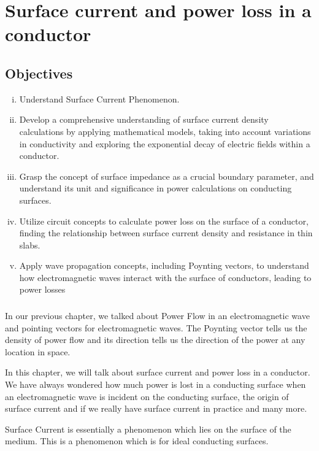 \chapter{Surface current and power loss in a conductor}\label{lec:lec28}

\begin{mdframed}[backgroundcolor=lightblue, linewidth=1pt,  hidealllines=true]
\section{Objectives}
\begin{enumerate}[(i)]
\item Understand Surface Current Phenomenon.
\item Develop a comprehensive understanding of surface current density calculations by applying mathematical models, taking into          account variations in conductivity and exploring the exponential decay of electric fields within a conductor.
\item Grasp the concept of surface impedance as a crucial boundary parameter, and
understand its unit and significance in power calculations on conducting
surfaces.
\item Utilize circuit concepts to calculate power loss on the surface of a conductor,
finding the relationship between surface current density and resistance in thin
slabs.
\item Apply wave propagation concepts, including Poynting vectors, to understand how electromagnetic waves interact with the surface of conductors, leading to power
losses
\end{enumerate}
\end{mdframed}
\subsection{}
In our previous chapter, we talked about Power Flow in an electromagnetic wave and pointing vectors for electromagnetic waves. The Poynting vector tells us the density of power flow and its direction tells us the direction of the power at any location in space.

In this chapter, we will talk about surface current and power loss in a conductor. We have always wondered how much power is lost in a conducting surface when an electromagnetic wave is incident on the conducting surface, the origin of surface current and if we really have surface current in practice and many more.

Surface Current is essentially a phenomenon which lies on the surface of the medium. This is a phenomenon which is for ideal conducting surfaces.

